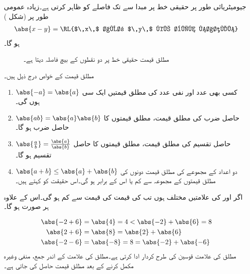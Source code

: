 جیومیٹریائی طور پر حقیقی خط پر مبدا  سے  تک فاصلے کو  ظاہر کرتی  ہے۔زیادہ عمومی طور پر (شکل ) 
\begin{align*}
\abs{x-y}=\text{\RL{$\,x\,$ اور $\,y\,$ کے بیچ فاصلہ}}
\end{align*}
ہو گا۔
\begin{figure}
\centering
{}
\caption{مطلق قیمت حقیقی خط پر دو نقطوں کے بیچ فاصلہ دیتا ہے۔}
\label{شکل_ابتدائی_مطلق_جیومیٹریائی_مطلب}
\end{figure}

مطلق قیمت کے خواص درج ذیل ہیں۔
\begin{enumerate}[1.]
\item{$\abs{-a}=\abs{a}$}\quad
کسی بھی عدد اور نفی عدد  کی مطلق قیمتیں ایک سی  ہوں گی۔
\item{$\abs{ab}=\abs{a}\abs{b}$}\quad
حاصل ضرب کی مطلق قیمت، مطلق قیمتوں کا حاصل ضرب ہو گا۔
\item{$\abs{\frac{a}{b}}=\frac{\abs{a}}{\abs{b}}$}\quad
حاصل تقسیم کی مطلق قیمت، مطلق قیمتوں کا حاصل تقسیم ہو گا۔
\item{$\abs{a+b}\le \abs{a}+\abs{b}$}\quad
دو اعداد کے مجموعے  کی مطلق قیمت دونوں کی  مطلق قیمتوں کے مجموعہ سے کم یا اس کے برابر ہو گی۔اس حقیقت  کو  کہتے ہیں۔
\end{enumerate}


اگر  اور  کی علامتیں مختلف ہوں تب  کی قیمت  کی قیمت سے کم ہو گی۔اس کے علاوہ ہر صورت  ہو گا۔

\begin{align*}
\abs{-2+6}&=\abs{4}=4<\abs{-2}+\abs{6}=8\\
\abs{2+6}&=\abs{8}=\abs{2}+\abs{6}\\
\abs{-2-6}&=\abs{-8}=8=\abs{-2}+\abs{-6}
\end{align*}
مطلق کی علامت قوسین کی طرح کردار ادا کرتی ہے۔مطلق کی علامت کے اندر جمع، منفی وغیرہ مکمل کرنے کے بعد مطلق قیمت حاصل کی جاتی ہے۔

